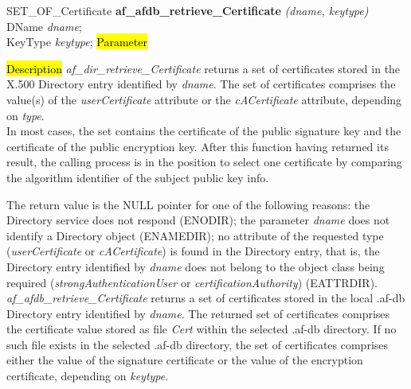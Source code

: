 SET\_OF\_Certificate {\bf *af\_afdb\_retrieve\_Certificate} {\em (dname, keytype)} \\
DName {\em *dname}; \\
KeyType {\em keytype};
\hl{Parameter}



\hl{Description}
{\em af\_dir\_retrieve\_Certificate} returns a set of certificates stored in the 
X.500 Directory entry identified by {\em dname}. The set of certificates comprises the
value(s) of the {\em userCertificate} attribute or the {\em cACertificate} attribute,
depending on {\em type}. \\
In most cases, the set contains the certificate of the public signature key and the 
certificate of the public encryption key. After this function having returned 
its result, the calling process is in the position to select one certificate 
by comparing the algorithm identifier of the subject public key info.

The return value is the NULL pointer for one of the following reasons:
\bi
\m the Directory service does not respond (ENODIR);
\m the parameter {\em dname} does not identify a Directory object (ENAMEDIR);
\m no attribute of the requested type ({\em userCertificate} or {\em cACertificate})
is found in the Directory entry, that is, the Directory entry identified by {\em dname} 
does not belong to the object class being required ({\em strongAuthenticationUser} or  
{\em certificationAuthority}) (EATTRDIR).
\ei
{\em af\_afdb\_retrieve\_Certificate} returns a set of certificates stored in the 
local .af-db Directory entry identified by {\em dname}.
The returned set of certificates comprises the certificate value stored as file {\em Cert}
within the selected .af-db directory. If no such file exists
in the selected .af-db directory, the set of certificates comprises either the
value of the signature certificate or the value of the encryption certificate, 
depending on {\em keytype}.



